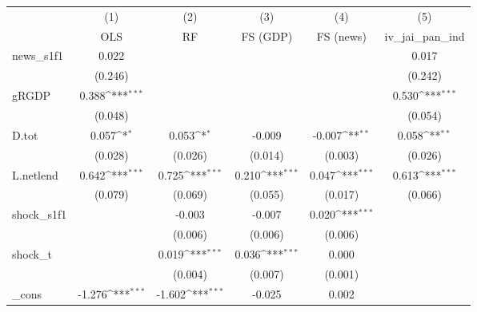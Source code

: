 {
\def\sym#1{\ifmmode^{#1}\else\(^{#1}\)\fi}
\begin{tabular}{l*{5}{c}}
\toprule
            &\multicolumn{1}{c}{(1)}&\multicolumn{1}{c}{(2)}&\multicolumn{1}{c}{(3)}&\multicolumn{1}{c}{(4)}&\multicolumn{1}{c}{(5)}\\
            &\multicolumn{1}{c}{OLS}&\multicolumn{1}{c}{RF}&\multicolumn{1}{c}{FS (GDP)}&\multicolumn{1}{c}{FS (news)}&\multicolumn{1}{c}{iv\_jai\_pan\_ind}\\
\midrule
news\_s1f1   &       0.022         &                     &                     &                     &       0.017         \\
            &     (0.246)         &                     &                     &                     &     (0.242)         \\
\addlinespace
gRGDP       &       0.388\sym{***}&                     &                     &                     &       0.530\sym{***}\\
            &     (0.048)         &                     &                     &                     &     (0.054)         \\
\addlinespace
D.tot       &       0.057\sym{*}  &       0.053\sym{*}  &      -0.009         &      -0.007\sym{**} &       0.058\sym{**} \\
            &     (0.028)         &     (0.026)         &     (0.014)         &     (0.003)         &     (0.026)         \\
\addlinespace
L.netlend   &       0.642\sym{***}&       0.725\sym{***}&       0.210\sym{***}&       0.047\sym{***}&       0.613\sym{***}\\
            &     (0.079)         &     (0.069)         &     (0.055)         &     (0.017)         &     (0.066)         \\
\addlinespace
shock\_s1f1  &                     &      -0.003         &      -0.007         &       0.020\sym{***}&                     \\
            &                     &     (0.006)         &     (0.006)         &     (0.006)         &                     \\
\addlinespace
shock\_t     &                     &       0.019\sym{***}&       0.036\sym{***}&       0.000         &                     \\
            &                     &     (0.004)         &     (0.007)         &     (0.001)         &                     \\
\addlinespace
\_cons      &      -1.276\sym{***}&      -1.602\sym{***}&      -0.025         &       0.002         &                     \\

\end{tabular}}
